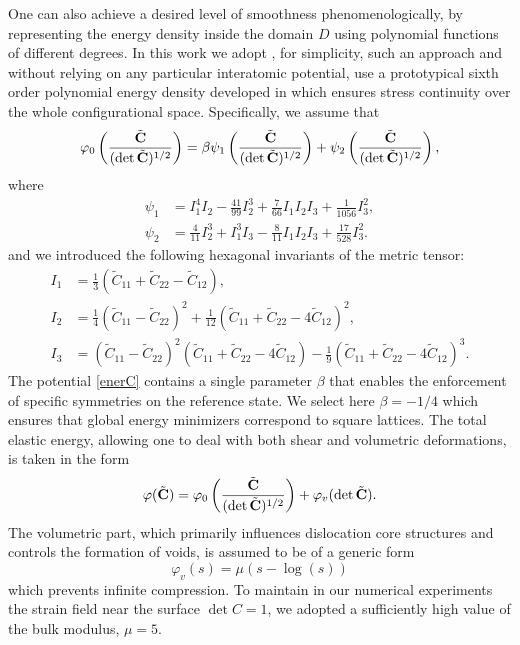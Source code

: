\documentclass[aps,
superscriptaddress,notitlepage]{revtex4-1}
\def\phi{\varphi}
\begin{document}
One can also achieve a desired level of smoothness phenomenologically, by representing  the energy density inside the domain  $D$ using  polynomial functions of different degrees.  In this work  we adopt , for simplicity, such an approach  and without relying  on any   particular interatomic potential,  use a prototypical   sixth order polynomial energy density developed in \cite{Parry1998,Conti2004-sv} which ensures stress continuity over the whole configurational space. 
Specifically, we assume that 
 \begin{equation}\label{enerC}
 \phi_0 \left( \frac{\tilde{\bf C}}{(\det {\tilde{\bf C}})^{1/2}} \right) = \beta\psi_1\left( \frac{\tilde{\bf C}}{(\det {\tilde{\bf C}})^{1/2}} \right) + \psi_2\left( \frac{\tilde{\bf C}}{(\det {\tilde{\bf C}})^{1/2}} \right), 
 \end{equation}
where 
\begin{align}
\psi_1 &= I_1^4 I_2 - \frac{41}{99} I_2^3 + \frac{7}{66} I_1 I_2 I_3 + \frac{1}{1056}I_3^2, \\
\psi_2 &= \frac{4}{11} I_2^3 + I_1^3 I_3 - \frac{8}{11} I_1 I_2 I_3 + \frac{17}{528} I_3^2.
\end{align}
and we introduced  the following hexagonal invariants of the metric tensor:
\begin{align}
I_1 &= \frac{1}{3}(\tilde{C}_{11} + \tilde{C}_{22} - \tilde{C}_{12}), \\
I_2 &= \frac{1}{4}(\tilde{C}_{11} - \tilde{C}_{22})^2 + \frac{1}{12}(\tilde{C}_{11} + \tilde{C}_{22} - 4\tilde{C}_{12})^2, \\
I_3 &= (\tilde{C}_{11} - \tilde{C}_{22})^2(\tilde{C}_{11} + \tilde{C}_{22} - 4\tilde{C}_{12}) - \frac{1}{9}(\tilde{C}_{11} + \tilde{C}_{22} - 4\tilde{C}_{12})^3.
\end{align}
The potential  \eqref{enerC} contains a single parameter $\beta$ that enables the enforcement of specific symmetries on the reference state. We select here  $\beta = -1/4$ which  ensures that global energy minimizers correspond to square lattices. The total elastic energy, allowing one to deal with both shear  and volumetric deformations, is taken in the form
 \begin{equation}
\phi(\tilde{\bf C}) = \phi_0 \left(\frac{\tilde{\bf C}}{(\det {\tilde{\bf C}})^{1/2}} \right) + \phi_v(\det \tilde{\bf C}). 
\end{equation}
 The volumetric part, which primarily influences dislocation core structures and controls the formation of voids, is assumed to be of a generic form
  \begin{equation}
 \phi_v(s) = \mu(s - \log(s)) 
 \end{equation}
 which prevents infinite compression. To maintain in our numerical experiments the strain field near the surface $\det C = 1$, we adopted   a sufficiently high value of the bulk modulus,  $\mu = 5$. 
  
\end{document}
